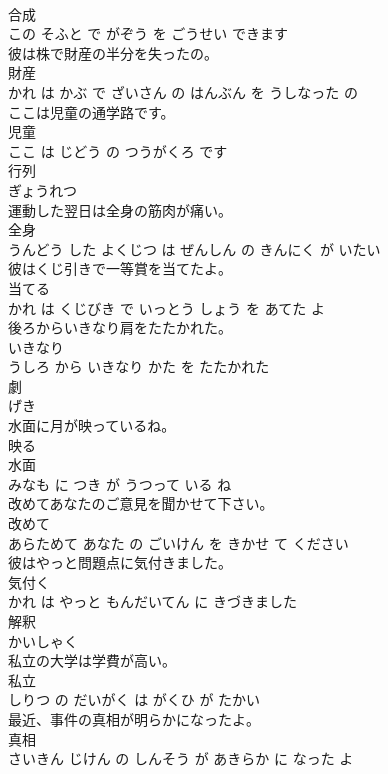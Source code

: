 \documentclass[8pt]{extreport}
\begin{document}
\begin{CJK}{UTF8}{min}
\\	合成 
\\	この そふと で がぞう を ごうせい できます			
\\	彼は株で財産の半分を失ったの。	
\\	財産 
\\	かれ は かぶ で ざいさん の はんぶん を うしなった の			
\\	ここは児童の通学路です。	
\\	児童 
\\	ここ は じどう の つうがくろ です			
\\	行列	
\\	ぎょうれつ			
\\	運動した翌日は全身の筋肉が痛い。	
\\	全身 
\\	うんどう した よくじつ は ぜんしん の きんにく が いたい			
\\	彼はくじ引きで一等賞を当てたよ。	
\\	当てる 
\\	かれ は くじびき で いっとう しょう を あてた よ			
\\	後ろからいきなり肩をたたかれた。	
\\	いきなり 
\\	うしろ から いきなり かた を たたかれた			
\\	劇	
\\	げき			
\\	水面に月が映っているね。	
\\	映る 
\\	水面 
\\	みなも に つき が うつって いる ね			
\\	改めてあなたのご意見を聞かせて下さい。	
\\	改めて 
\\	あらためて あなた の ごいけん を きかせ て ください			
\\	彼はやっと問題点に気付きました。	
\\	気付く 
\\	かれ は やっと もんだいてん に きづきました			
\\	解釈	
\\	かいしゃく			
\\	私立の大学は学費が高い。	
\\	私立 
\\	しりつ の だいがく は がくひ が たかい			
\\	最近、事件の真相が明らかになったよ。	
\\	真相 
\\	さいきん じけん の しんそう が あきらか に なった よ			

\end{CJK}
\end{document}
